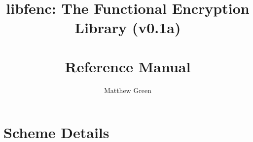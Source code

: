 \documentclass[11pt]{book}
\begin{document}


\newcommand{\libraryname}{Functional Encryption Library}
\newcommand{\libraryshort}{{\sf libfenc}}
\newcommand{\version}{0.1a}
\newcommand{\libraryunixlib}{{\tt libfenc.la}}
\newcommand{\librarylicensename}{Internal Distribution Only}
\newcommand{\librarylicenseurl}{http://nowhere.nowhere}


\title{\libraryshort: The {\libraryname} (v\version) \\ ~\\ Reference Manual}
\author{Matthew Green}
\maketitle


\tableofcontents







\appendix
\chapter{Scheme Details}



\end{document}
